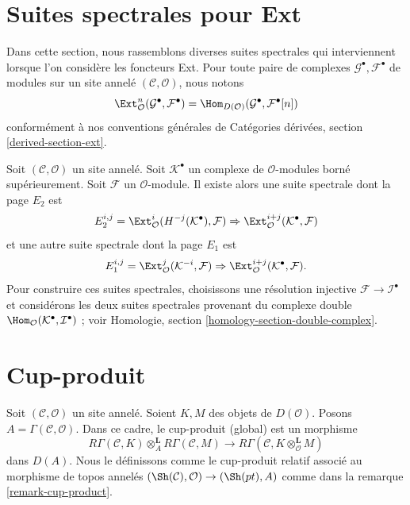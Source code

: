 \section{Suites spectrales pour Ext}
\label{section-spectral-sequence-ext}

\noindent
Dans cette section, nous rassemblons diverses suites spectrales qui interviennent
lorsque l'on considère les foncteurs Ext. Pour toute paire de complexes
$\mathcal{G}^\bullet, \mathcal{F}^\bullet$ de modules sur un site annelé
$(\mathcal{C}, \mathcal{O})$, nous notons
$$
\Ext^n_\mathcal{O}(\mathcal{G}^\bullet, \mathcal{F}^\bullet)
=
\Hom_{D(\mathcal{O})}(\mathcal{G}^\bullet, \mathcal{F}^\bullet[n])
$$
conformément à nos conventions générales de
Catégories dérivées, section \ref{derived-section-ext}.

\begin{example}
\label{example-hom-complex-into-sheaf}
Soit $(\mathcal{C}, \mathcal{O})$ un site annelé.
Soit $\mathcal{K}^\bullet$ un complexe de $\mathcal{O}$-modules borné supérieurement.
Soit $\mathcal{F}$ un $\mathcal{O}$-module. Il existe alors une
suite spectrale dont la page $E_2$ est
$$
E_2^{i, j} =
\Ext_\mathcal{O}^i(H^{-j}(\mathcal{K}^\bullet), \mathcal{F})
\Rightarrow
\Ext_\mathcal{O}^{i + j}(\mathcal{K}^\bullet, \mathcal{F})
$$
et une autre suite spectrale dont la page $E_1$ est
$$
E_1^{i, j} =
\Ext_\mathcal{O}^j(\mathcal{K}^{-i}, \mathcal{F})
\Rightarrow
\Ext_\mathcal{O}^{i + j}(\mathcal{K}^\bullet, \mathcal{F}).
$$
Pour construire ces suites spectrales, choisissons une résolution injective
$\mathcal{F} \to \mathcal{I}^\bullet$ et considérons les deux suites
spectrales provenant du complexe double
$\Hom_\mathcal{O}(\mathcal{K}^\bullet, \mathcal{I}^\bullet)$ ; voir
Homologie, section \ref{homology-section-double-complex}.
\end{example}








\section{Cup-produit}
\label{section-cup-product}

\noindent
Soit $(\mathcal{C}, \mathcal{O})$ un site annelé. Soient
$K, M$ des objets de $D(\mathcal{O})$. Posons
$A = \Gamma(\mathcal{C}, \mathcal{O})$. Dans ce cadre, le cup-produit (global)
est un morphisme
$$
R\Gamma(\mathcal{C}, K) \otimes_A^\mathbf{L}
R\Gamma(\mathcal{C}, M)
\longrightarrow
R\Gamma(\mathcal{C}, K \otimes_\mathcal{O}^\mathbf{L} M)
$$
dans $D(A)$. Nous le définissons comme le cup-produit relatif associé
au morphisme de topos annelés
$(\Sh(\mathcal{C}), \mathcal{O}) \to (\Sh(pt), A)$
comme dans la remarque \ref{remark-cup-product}.


